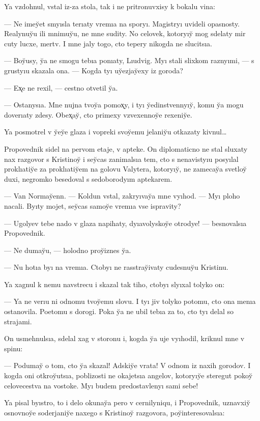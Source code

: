 \documentclass[10pt]{book}
\begin{document}
Ya vzdohnul, vstal iz-za stola, tak i ne pritronuvxisy k bokalu vina:

— Ne imey̆et smyısla terıaty vremıa na sporyı. Magistryı uvideli opasnosty. Realynuy̆u ili mnimuy̆u, ne mne sudity. No celovek, kotoryıy̆ mog sdelaty mir cuty lucxe, mertv. I mne jaly togo, cto tepery nikogda ne slucitsıa.

— Boy̆usy, y̆a ne smogu tebıa ponıaty, Lıudvig. Myı stali slixkom raznyımi, — s grustyıu skazala ona. — Kogda tyı uy̆ezjay̆exy iz goroda?

— Ex̨e ne rexil, — cestno otvetil y̆a.

— Ostanysıa. Mne nujna tvoy̆a pomox̨y, i tyı y̆edinstvennyıy̆, komu y̆a mogu doverıaty zdesy. Obex̨ay̆, cto primexy vzvexennoy̆e rexeniy̆e.

Ya posmotrel v y̆ey̆e glaza i vopreki svoy̆emu jelaniy̆u otkazaty kivnul…

Propovednik sidel na pervom etaje, v apteke. On diplomaticno ne stal sluxaty nax razgovor s Kristinoy̆ i sey̆cas zanimalsıa tem, cto s nenavistyıu posyılal proklıatiy̆e za proklıatiy̆em na golovu Valytera, kotoryıy̆, ne zamecay̆a svetloy̆ duxi, negromko besedoval s sedoborodyım aptekarem.

— Van Normay̆enn. — Koldun vstal, zakryıvay̆a mne vyıhod. — Myı ploho nacali. Byıty mojet, sey̆cas samoy̆e vremıa vse ispravity?

— Ugolyev tebe nado v glaza napihaty, dyıavolyskoy̆e otrodye! — besnovalsıa Propovednik.

— Ne dumay̆u, — holodno proy̆iznes y̆a.

— Nu hotıa byı na vremıa. Ctobyı ne rasstray̆ivaty cudesnuy̆u Kristinu.

Ya xagnul k nemu navstrecu i skazal tak tiho, ctobyı slyıxal tolyko on:

— Ya ne verıu ni odnomu tvoy̆emu slovu. I tyı jiv tolyko potomu, cto ona menıa ostanovila. Poetomu s dorogi. Poka y̆a ne ubil tebıa za to, cto tyı delal so strajami.

On usmehnulsıa, sdelal xag v storonu i, kogda y̆a uje vyıhodil, kriknul mne v spinu:

— Podumay̆ o tom, cto y̆a skazal! Adskiy̆e vrata! V odnom iz naxih gorodov. I kogda oni otkroy̆utsıa, poblizosti ne okajetsıa angelov, kotoryıy̆e steregut pokoy̆ celovecestva na vostoke. Myı budem predostavlenyı sami sebe!



Ya pisal byıstro, to i delo okunay̆a pero v cernilyniqu, i Propovednik, uznavxiy̆ osnovnoy̆e soderjaniy̆e naxego s Kristinoy̆ razgovora, poy̆interesovalsıa:
\end{document}
